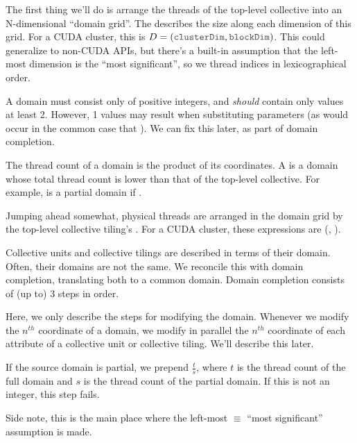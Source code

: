 \filbreak
{}

The first thing we'll do is arrange the threads of the top-level collective into an N-dimensional ``domain grid''.
The  describes the size along each dimension of this grid.
For a CUDA cluster, this is $D = (\lighttt{clusterDim}, \lighttt{blockDim})$.
This could generalize to non-CUDA APIs, but there's a built-in assumption that the left-most dimension is the ``most significant'', so we  thread indices in lexicographical order.

A domain must consist only of positive integers, and \textit{should} contain only values at least 2.
However, 1 values may result when substituting parameters (as would occur in the common case that ).
We can fix this later, as part of domain completion.

\filbreak
The thread count of a domain is the product of its coordinates.
A  is a domain whose total thread count is lower than that of the top-level collective.
For example,  is a partial domain if .

\filbreak
Jumping ahead somewhat, physical threads are arranged in the domain grid by the top-level collective tiling's .
For a CUDA cluster, these expressions are (, ).

\filbreak
{}

Collective units and collective tilings are described in terms of their domain.
Often, their domains are not the same.
We reconcile this with domain completion, translating both to a common domain.
Domain completion consists of (up to) 3 steps in order.

\filbreak
Here, we only describe the steps for modifying the domain.
Whenever we modify the $n^{th}$ coordinate of a domain, we modify in parallel the $n^{th}$ coordinate of each attribute of a collective unit or collective tiling.
We'll describe this later.

\filbreak
{} If the source domain is partial, we prepend $\frac{t}{s}$, where $t$ is the thread count of the full domain and $s$ is the thread count of the partial domain.
If this is not an integer, this step fails.

Side note, this is the main place where the left-most $\equiv$ ``most significant'' assumption is made.

